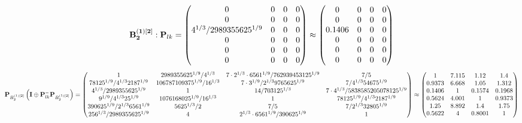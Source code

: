 \documentclass[10pt,a4paper]{article}
\begin{document}
	\[
		\bold{B_2^{(1)[2]}}: \bold{P}_{lk} = 
		\begin{pmatrix}
			{{0}}{} & {{0}}{} & {{0}}{} & {{0}}{} \\
			{{0}}{} & {{0}}{} & {{0}}{} & {{0}}{} \\
			{{4^ {1 / 3}}} / {{2989355625^ {1 / 9}}} & {{0}}{} & {{0}}{} & {{0}}{} \\
			{{0}}{} & {{0}}{} & {{0}}{} & {{0}}{} \\
			{{0}}{} & {{0}}{} & {{0}}{} & {{0}}{} \\
			{{0}}{} & {{0}}{} & {{0}}{} & {{0}}{} \\
		\end{pmatrix}
		\approx
		\begin{pmatrix}
			0        & 0        & 0        & 0        \\
			0        & 0        & 0        & 0        \\
			0.1406   & 0        & 0        & 0        \\
			0        & 0        & 0        & 0        \\
			0        & 0        & 0        & 0        \\
			0        & 0        & 0        & 0        \\
		\end{pmatrix}
	\]
	\[
		\bold{P}_{B_2^{(1)[2]}}\left(\bold{I} \oplus \bold{P}_{lk}^{-}\bold{P}_{B_2^{(1)[2]}}\right) = 
		\begin{pmatrix}
			{1}{} & {{2989355625^ {1 / 9}}} / {{4^ {1 / 3}}} & {{7} \cdot {2^ {1 / 3}} \cdot {6561^ {1 / 9}}} / {{762939453125^ {1 / 9}}} & {{7}} / {{5}} \\
			{{78125^ {1 / 9}}} / {{4^ {1 / 3}}{2187^ {1 / 9}}} & {{106787109375^ {1 / 9}}} / {{16^ {1 / 3}}} & {{7} \cdot {3^ {1 / 9}}} / {{2^ {1 / 3}}{9765625^ {1 / 9}}} & {{7}} / {{4^ {1 / 3}}{54675^ {1 / 9}}} \\
			{{4^ {1 / 3}}} / {{2989355625^ {1 / 9}}} & {1}{} & {{14}} / {{703125^ {1 / 3}}} & {{7} \cdot {4^ {1 / 3}}} / {{5838585205078125^ {1 / 9}}} \\
			{{9^ {1 / 9}}} / {{4^ {1 / 3}}{25^ {1 / 9}}} & {{1076168025^ {1 / 9}}} / {{16^ {1 / 3}}} & {1}{} & {{78125^ {1 / 9}}} / {{4^ {1 / 3}}{2187^ {1 / 9}}} \\
			{{390625^ {1 / 9}}} / {{2^ {1 / 3}}{6561^ {1 / 9}}} & {{5625^ {1 / 3}}} / {{2}} & {{7}} / {{5}} & {{7}} / {{2^ {1 / 3}}{32805^ {1 / 9}}} \\
			{{256^ {1 / 3}}} / {{2989355625^ {1 / 9}}} & {{4}}{} & {{2^ {1 / 3}} \cdot {6561^ {1 / 9}}} / {{390625^ {1 / 9}}} & {1}{} \\
		\end{pmatrix}
		\approx
		\begin{pmatrix}
			1        & 7.115    & 1.12     & 1.4      \\
			0.9373   & 6.668    & 1.05     & 1.312    \\
			0.1406   & 1        & 0.1574   & 0.1968   \\
			0.5624   & 4.001    & 1        & 0.9373   \\
			1.25     & 8.892    & 1.4      & 1.75     \\
			0.5622   & 4        & 0.8001   & 1        \\
		\end{pmatrix}
	\]
\end{document}
